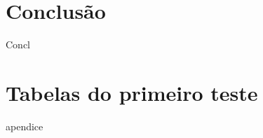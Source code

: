 \documentclass[
    12pt,               %
    openright,          %
    oneside,
    a4paper,            %
    english,            %
    french,             %
    spanish,            %
    brazil              %
    ]{abntex2}
\begin{document}

\chapter{Conclusão}

Concl

\postextual


%

\begin{apendicesenv}
\label{chap:apendices}

\partapendices

\chapter{Tabelas do primeiro teste}
apendice



\end{apendicesenv}
\end{document}
